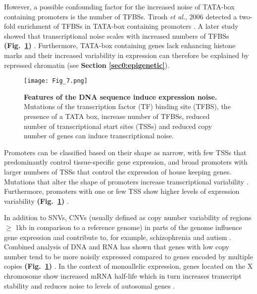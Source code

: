 However, a possible confounding factor for the increased noise of TATA-box containing promoters is the number of TFBSs. 
Tirosh \textit{et al.}, 2006 detected a two-fold enrichment of TFBSs in TATA-box containing promoters \citep{Tirosh2006}. 
A later study showed that transcriptional noise scales with increased numbers of TFBSs \textbf{(Fig.~\ref{fig0:DNA_features})} \citep{Sharon2014}. 
Furthermore, TATA-box containing genes lack enhancing histone marks and their increased variability in expression can therefore be explained by repressed chromatin \citep{Choi2008} (see \textbf{Section \ref{sec0:epigenetic}}).  

\begin{figure}[!h]
\centering
\texttt{[image: Fig\_7.png]}
\caption[Features of the DNA sequence induce expression noise]{\textbf{Features of the DNA sequence induce expression noise.}\\
Mutations of the transcription factor (TF) binding site (TFBS), the presence of a TATA box, increase number of TFBSs, reduced number of transcriptional start sites (TSSs) and reduced copy number of genes can induce transcriptional noise.}
\label{fig0:DNA_features}
\end{figure}

Promoters can be classified based on their shape as narrow, with few \glspl{TSS} that predominantly control tissue-specific gene expression, and broad promoters with larger numbers of TSSs that control the expression of house keeping genes. 
Mutations that alter the shape of promoters increase transcriptional variability \citep{Schor2017a}. 
Furthermore, promoters with one or few TSS show higher levels of expression variability \textbf{(Fig.~\ref{fig0:DNA_features})} \citep{Faure2017}.

\newpage

In addition to \glspl{SNV}, \glspl{CNV} (usually defined as copy number variability of regions $\geq$ 1kb in comparison to a reference genome) in parts of the genome influence gene expression and contribute to, for example, schizophrenia and autism \citep{Gamazon2015}. 
Combined analysis of DNA and RNA has shown that genes with low copy number tend to be more noisily expressed compared to genes encoded by multiple copies \textbf{(Fig.~\ref{fig0:DNA_features})} \citep{Dey2015}. 
In the context of monoallelic expression, genes located on the X chromosome show increased mRNA half-life which in turn increases transcript stability and reduces noise to levels of autosomal genes \citep{Faure2017}.\\

